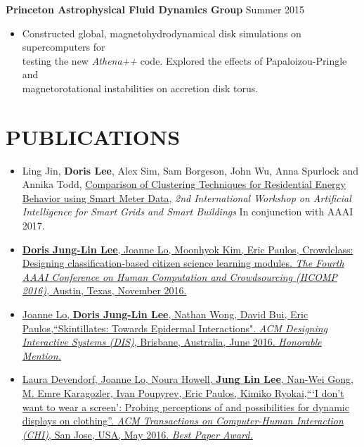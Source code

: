 \documentclass{res}
\begin{document}
\begin{resume}
\begin{tabbing}
    {\bf Princeton Astrophysical Fluid Dynamics Group}  \>\> \hspace{34pt} Summer 2015 
    \\ 
   \end{tabbing}    
    \begin{itemize}
     \vspace{-20pt}
     \item Constructed global, magnetohydrodynamical disk simulations on supercomputers for \\testing the new \textit{Athena++} code. Explored the effects of Papaloizou-Pringle and \\magnetorotational instabilities on accretion disk torus. 
     \end{itemize}    \vspace{-10pt}   
\section{PUBLICATIONS}
\begin{itemize}
\item Ling Jin, \textbf{Doris Lee}, Alex Sim, Sam Borgeson, John Wu, Anna Spurlock and Annika Todd, \href{https://sdm.lbl.gov/perf/AISGSB2017-final2.pdf}{Comparison of Clustering Techniques for Residential Energy Behavior using Smart Meter Data}, \textit{2nd International Workshop on Artificial Intelligence for Smart Grids and Smart Buildings} In conjunction with AAAI 2017.
\item \href{http://aaai.org/ocs/index.php/HCOMP/HCOMP16/paper/viewFile/14027/13638}{\textbf{Doris Jung-Lin Lee}, Joanne Lo, Moonhyok Kim, Eric Paulos, Crowdclass: Designing classification-based citizen science learning modules. \textit{The Fourth AAAI Conference on Human Computation and Crowdsourcing (HCOMP 2016)}, Austin, Texas, November 2016.}
\item \href{http://dl.acm.org/citation.cfm?id=2901885&CFID=765226474&CFTOKEN=46922780}{Joanne Lo, \textbf{Doris Jung-Lin Lee}, Nathan Wong, David Bui, Eric Paulos,``Skintillates: Towards Epidermal Interactions".  \textit{ACM Designing Interactive Systems (DIS)}, Brisbane, Australia, June 2016. \textit{Honorable Mention.}}
\item \href{http://dl.acm.org/citation.cfm?id=2858192&CFID=765226474&CFTOKEN=46922780}{Laura Devendorf, Joanne Lo, Noura Howell, \textbf{Jung Lin Lee}, Nan-Wei Gong, M. Emre Karagozler, Ivan  Poupyrev, Eric Paulos, Kimiko Ryokai,``\hspace{1pt}`I don’t want to wear a screen': Probing perceptions of and  possibilities for dynamic displays on clothing''. \textit{ACM Transactions on Computer-Human Interaction (CHI)}, San Jose, USA, May 2016. \textit{Best Paper Award.}}

\end{itemize}
\end{resume}
\end{document}
